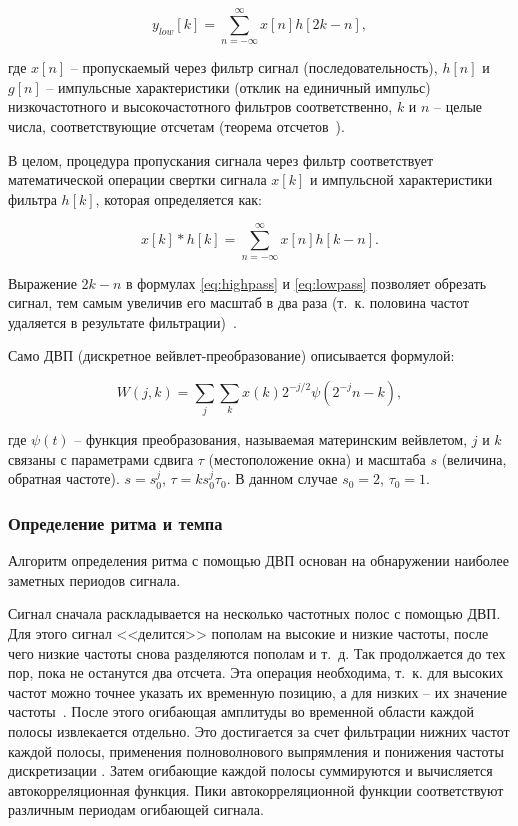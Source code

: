 \begin{equation}\label{eq:lowpass}
	y_{low}[k] = \sum_{n=-\infty}^{\infty} x[n] h[2k-n],
\end{equation}

где $x[n]$ -- пропускаемый через фильтр сигнал (последовательность), $h[n]$ и $g[n]$ -- импульсные характеристики (отклик на единичный импульс) низкочастотного и высокочастотного фильтров соответственно, $k$ и $n$ -- целые числа, соответствующие отсчетам (теорема отсчетов~\cite{samples}).

В целом, процедура пропускания сигнала через фильтр соответствует математической операции свертки сигнала $x[k]$ и импульсной характеристики фильтра $h[k]$, которая определяется как:

\begin{equation}\label{eq:conv}
	x[k]*h[k] = \sum_{n=-\infty}^{\infty} x[n] h[k-n].
\end{equation}

Выражение $2k-n$ в формулах \ref{eq:highpass} и \ref{eq:lowpass} позволяет обрезать сигнал, тем самым увеличив его масштаб в два раза (т.~к. половина частот удаляется в результате фильтрации)~\cite{polikar}.

Само ДВП (дискретное вейвлет-преобразование) описывается формулой:

\begin{equation}\label{eq:dwt}
	W(j, k) = \sum_{j}\sum_{k} x(k) 2^{-j/2} \psi(2^{-j}n-k),
\end{equation}

где $\psi(t)$ -- функция преобразования, называемая материнским вейвлетом, $j$ и $k$ связаны с параметрами сдвига $\tau$ (местоположение окна) и масштаба $s$ (величина, обратная частоте). $s = s_0^j$, $\tau = k s_0^j \tau_0$. В данном случае $s_0 = 2$, $\tau_0 = 1$.

\subsubsection{Определение ритма и темпа}

Алгоритм определения ритма с помощью ДВП основан на обнаружении наиболее заметных периодов сигнала.

Сигнал сначала раскладывается на несколько частотных полос с помощью ДВП. Для этого сигнал <<делится>> пополам на высокие и низкие частоты, после чего низкие частоты снова разделяются пополам и т.~д. Так продолжается до тех пор, пока не останутся два отсчета. Эта операция необходима, т.~к. для высоких частот можно точнее указать их временную позицию, а для низких -- их значение частоты~\cite{polikar}. После этого огибающая амплитуды во временной области каждой полосы извлекается отдельно. Это достигается за счет фильтрации нижних частот каждой полосы, применения полноволнового выпрямления и понижения частоты дискретизации \cite{dwt}. Затем огибающие каждой полосы суммируются и вычисляется автокорреляционная функция. Пики автокорреляционной функции соответствуют различным периодам огибающей сигнала.

